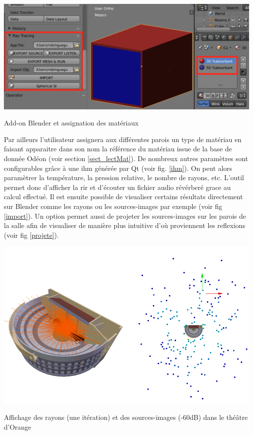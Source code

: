 \begin{figureth}
	\includegraphics[width=\linewidth]{images/add-on}
	\caption{Add-on Blender et assignation des matériaux}
	\label{add-on}
\end{figureth}
Par ailleurs l'utilisateur assignera aux différentes parois un type de matériau en faisant apparaitre dans son nom la référence du matériau issue de la base de donnée Odéon (voir section \ref{sect_lectMat}). De nombreux autres paramètres sont configurables grâce à une \gls{ihm} générée par Qt (voir fig. \ref{ihm}). On peut alors paramètrer la température, la pression relative, le nombre de rayons, etc. L'outil permet donc d'afficher la \gls{rir} et d'écouter un fichier audio révérberé grace au calcul effectué. Il est ensuite possible de visualiser certains résultats directement sur Blender comme les rayons ou les sources-images par exemple (voir fig \ref{import}). Un option permet aussi de projeter les sources-images sur les parois de la salle afin de visualiser de manière plus intuitive d'où proviennent les reflexions (voir fig \ref{projete}).
\begin{figureth}
	\includegraphics[width=\linewidth]{images/import}
	\caption{Affichage des rayons (une itération) et des sources-images (-60dB) dans le théâtre d'Orange}
	\label{import}
\end{figureth}


